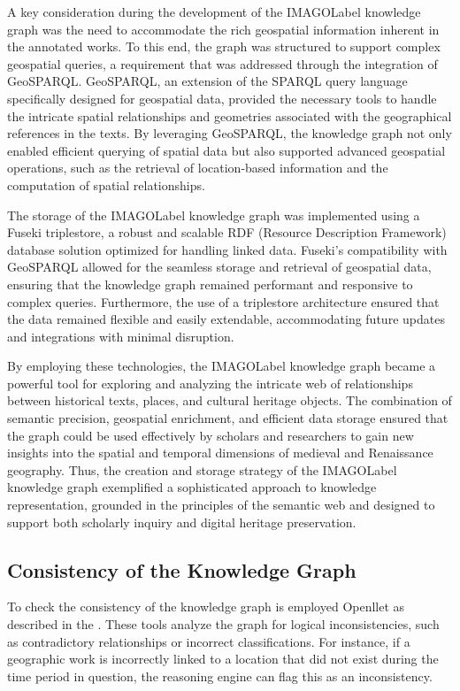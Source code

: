 A key consideration during the development of the \acrshort{IMAGOLabel} knowledge graph was the need to accommodate the rich geospatial information inherent in the annotated works. To this end, the graph was structured to support complex geospatial queries, a requirement that was addressed through the integration of GeoSPARQL. GeoSPARQL, an extension of the SPARQL query language specifically designed for geospatial data, provided the necessary tools to handle the intricate spatial relationships and geometries associated with the geographical references in the texts. By leveraging GeoSPARQL, the knowledge graph not only enabled efficient querying of spatial data but also supported advanced geospatial operations, such as the retrieval of location-based information and the computation of spatial relationships.

The storage of the \acrshort{IMAGOLabel} knowledge graph was implemented using a Fuseki triplestore, a robust and scalable RDF (Resource Description Framework) database solution optimized for handling linked data. Fuseki’s compatibility with GeoSPARQL allowed for the seamless storage and retrieval of geospatial data, ensuring that the knowledge graph remained performant and responsive to complex queries. Furthermore, the use of a triplestore architecture ensured that the data remained flexible and easily extendable, accommodating future updates and integrations with minimal disruption.

By employing these technologies, the \acrshort{IMAGOLabel} knowledge graph became a powerful tool for exploring and analyzing the intricate web of relationships between historical texts, places, and cultural heritage objects. The combination of semantic precision, geospatial enrichment, and efficient data storage ensured that the graph could be used effectively by scholars and researchers to gain new insights into the spatial and temporal dimensions of medieval and Renaissance geography. Thus, the creation and storage strategy of the \acrshort{IMAGOLabel} knowledge graph exemplified a sophisticated approach to knowledge representation, grounded in the principles of the semantic web and designed to support both scholarly inquiry and digital heritage preservation.


\subsection{Consistency of the Knowledge Graph}\label{VII-subsec:imago-consistency}

To check the consistency of the knowledge graph is employed Openllet\cite{galigatorGaligatorOpenllet2024} as described in the . These tools analyze the graph for logical inconsistencies, such as contradictory relationships or incorrect classifications. For instance, if a geographic work is incorrectly linked to a location that did not exist during the time period in question, the reasoning engine can flag this as an inconsistency.

